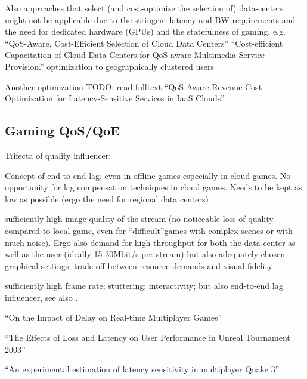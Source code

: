 Also approaches that select (and cost-optimize the selection of) data-centers might not be applicable due to the stringent latency and BW requirements and the need for dedicated hardware (GPUs) and the statefulness of gaming, e.g.
``QoS-Aware, Cost-Efficient Selection of Cloud Data Centers'' \cite{6740249}
``Cost-efficient Capacitation of Cloud Data Centers for QoS-aware Multimedia Service Provision.'' \cite{hans2014cost} optimization to geographically clustered users


Another optimization TODO: read fulltext
``QoS-Aware Revenue-Cost Optimization for Latency-Sensitive Services in IaaS Clouds'' \cite{6365107}


\subsection{Gaming QoS/QoE}

Trifecta of quality influencer:

Concept of end-to-end lag, even in offline games especially in cloud games. No opportunity for lag compensation techniques in cloud games. Needs to be kept as low as possible (ergo the need for regional data centers)

sufficiently high image quality of the stream (no noticeable loss of quality compared to local game, even for ``difficult''games with complex scenes or with much noise). Ergo also demand for high throughput for both the data center as well as the user (ideally 15-30Mbit/s per stream)
but also adequately chosen graphical settings; trade-off between resource demands and visual fidelity


sufficiently high frame rate; stuttering; interactivity; but also end-to-end lag influencer, see also \cite{metzger16lagmodel}.



``On the Impact of Delay on Real-time Multiplayer Games'' \cite{Pantel:2002:IDR:507670.507674}

``The Effects of Loss and Latency on User Performance in Unreal Tournament 2003'' \cite{Beigbeder:2004:ELL:1016540.1016556}

``An experimental estimation of latency sensitivity in multiplayer Quake 3'' \cite{1266180}


